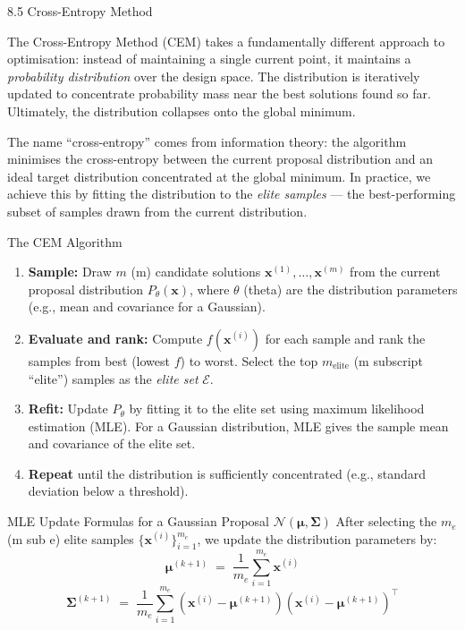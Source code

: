 \documentclass[aspectratio=169,10pt]{beamer}
\begin{document}
\begin{frame}[allowframebreaks]{8.5 Cross-Entropy Method}

The Cross-Entropy Method (CEM) takes a fundamentally different approach to optimisation: instead of maintaining a single current point, it maintains a \emph{probability distribution} over the design space.
The distribution is iteratively updated to concentrate probability mass near the best solutions found so far.
Ultimately, the distribution collapses onto the global minimum.

The name ``cross-entropy'' comes from information theory: the algorithm minimises the cross-entropy between the current proposal distribution and an ideal target distribution concentrated at the global minimum. In practice, we achieve this by fitting the distribution to the \emph{elite samples} --- the best-performing subset of samples drawn from the current distribution.

\begin{block}{The CEM Algorithm}
\begin{enumerate}
  \item \textbf{Sample:} Draw $m$ (m) candidate solutions $\mathbf{x}^{(1)}, \ldots, \mathbf{x}^{(m)}$ from the current proposal distribution $P_\theta(\mathbf{x})$, where $\theta$ (theta) are the distribution parameters (e.g., mean and covariance for a Gaussian).
  \item \textbf{Evaluate and rank:} Compute $f(\mathbf{x}^{(i)})$ for each sample and rank the samples from best (lowest $f$) to worst. Select the top $m_\text{elite}$ (m subscript ``elite'') samples as the \emph{elite set} $\mathcal{E}$.
  \item \textbf{Refit:} Update $P_\theta$ by fitting it to the elite set using maximum likelihood estimation (MLE). For a Gaussian distribution, MLE gives the sample mean and covariance of the elite set.
  \item \textbf{Repeat} until the distribution is sufficiently concentrated (e.g., standard deviation below a threshold).
\end{enumerate}
\end{block}

\begin{block}{MLE Update Formulas for a Gaussian Proposal $\mathcal{N}(\bm{\mu}, \bm{\Sigma})$}
After selecting the $m_e$ (m sub e) elite samples $\{\mathbf{x}^{(i)}\}_{i=1}^{m_e}$, we update the distribution parameters by:
\[
  \bm{\mu}^{(k+1)} \;=\; \frac{1}{m_e}\sum_{i=1}^{m_e}\mathbf{x}^{(i)}
\]
\[
  \bm{\Sigma}^{(k+1)} \;=\; \frac{1}{m_e}\sum_{i=1}^{m_e}\!\left(\mathbf{x}^{(i)}-\bm{\mu}^{(k+1)}\right)\!\left(\mathbf{x}^{(i)}-\bm{\mu}^{(k+1)}\right)^\top
\]
\end{block}


\end{frame}
\end{document}
